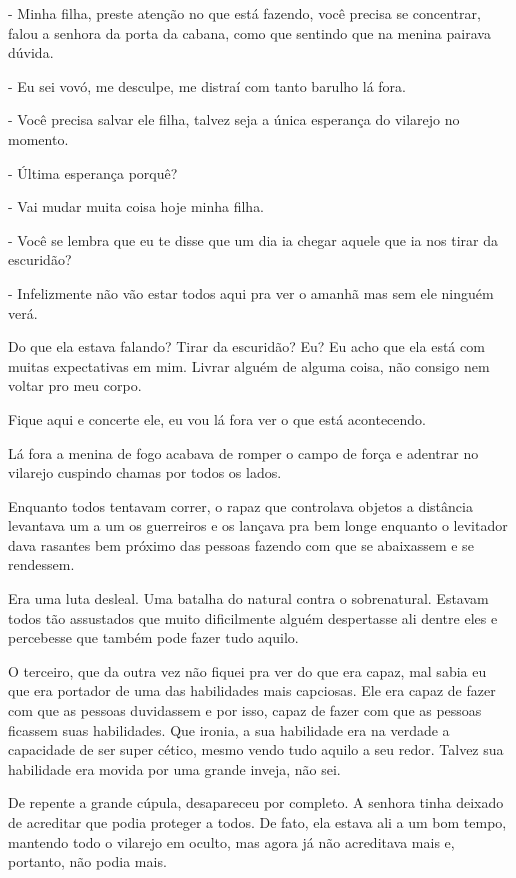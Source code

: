 - Minha filha, preste atenção no que está fazendo, você precisa se concentrar, falou a senhora da porta da cabana, como que sentindo que na menina pairava dúvida.

- Eu sei vovó, me desculpe, me distraí com tanto barulho lá fora.

- Você precisa salvar ele filha, talvez seja a única esperança do vilarejo no momento.

- Última esperança porquê?

- Vai mudar muita coisa hoje minha filha.

- Você se lembra que eu te disse que um dia ia chegar aquele que ia nos tirar da escuridão?

- Infelizmente não vão estar todos aqui pra ver o amanhã mas sem ele ninguém verá.

Do que ela estava falando? Tirar da escuridão? Eu? Eu acho que ela está com muitas expectativas em mim. Livrar alguém de alguma coisa, não consigo nem voltar pro meu corpo.

Fique aqui e concerte ele, eu vou lá fora ver o que está acontecendo.

Lá fora a menina de fogo acabava de romper o campo de força e adentrar no vilarejo cuspindo chamas por todos os lados.

Enquanto todos tentavam correr, o rapaz que controlava objetos a distância levantava um a um os guerreiros e os lançava pra bem longe enquanto o levitador dava rasantes bem próximo das pessoas fazendo com que se abaixassem e se rendessem.

Era uma luta desleal. Uma batalha do natural contra o sobrenatural. Estavam todos tão assustados que muito dificilmente alguém despertasse ali dentre eles e percebesse que também pode fazer tudo aquilo.

O terceiro, que da outra vez não fiquei pra ver do que era capaz, mal sabia eu que era portador de uma das habilidades mais capciosas. Ele era capaz de fazer com que as pessoas duvidassem e por isso, capaz de fazer com que as pessoas ficassem suas habilidades. Que ironia, a sua habilidade era na verdade a capacidade de ser super cético, mesmo vendo tudo aquilo a seu redor. Talvez sua habilidade era movida por uma grande inveja, não sei.

De repente a grande cúpula, desapareceu por completo. A senhora tinha deixado de acreditar que podia proteger a todos. De fato, ela estava ali a um bom tempo, mantendo todo o vilarejo em oculto, mas agora já não acreditava mais e, portanto, não podia mais.

